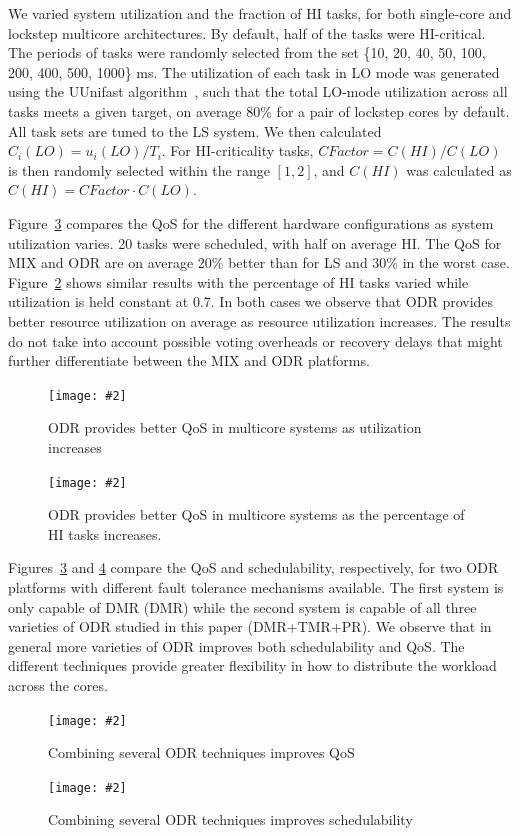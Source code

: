\documentclass[conference]{IEEEtran}
\newcommand{\addfigure}[4]{
\begin{figure}[fh]
	\centering
	\texttt{[image: \#2]}
	\caption{#3}
	\label{#4}
\end{figure}
}
\begin{document}
	We varied system utilization and the fraction of HI tasks, for both single-core and lockstep multicore architectures.
	By default, half of the tasks were HI-critical. The periods of tasks were randomly selected from the set \{10, 20, 40, 50, 100, 200, 400, 500, 1000\} ms.
	The utilization of each task in LO mode was generated using the UUnifast algorithm~\cite{bini2005measuring}, such that the total LO-mode utilization across all tasks meets a given target, on average $80\%$ for a pair of lockstep cores by default. All task sets are tuned to the LS system. 
	We then calculated $C_i(LO) =  u_i(LO)/T_i$. 
	For HI-criticality tasks, $CFactor=C(HI)/C(LO)$ is then randomly selected within the range $[1, 2]$, and $C(HI)$ was calculated as $C(HI)=CFactor \cdot C(LO)$.
	
	Figure~\ref{f:mc-mec-qos-hi} compares the QoS for the different hardware configurations as system utilization varies. 20 tasks were scheduled, with half on average HI. The QoS for MIX and ODR are on average 20\% better than for LS and 30\% in the worst case. Figure~\ref{f:mc-hitasks} shows similar results with the percentage of HI tasks varied while utilization is held constant at 0.7. In both cases we observe that ODR provides better resource utilization on average as resource utilization increases. The results do not take into account possible voting overheads or recovery delays that might further differentiate between the MIX and ODR platforms. 
	
	\addfigure{0}{platform-qos.pdf}{ODR provides better QoS in multicore systems as utilization increases}{f:mc-mec-qos-hi}
	\addfigure{0}{hitask.pdf}{ODR provides better QoS in multicore systems as the percentage of HI tasks increases.}{f:mc-hitasks}
	
	Figures~\ref{f:mc-mec-qos-hi} and \ref{f:mc-mec-sched} compare the QoS and schedulability, respectively, for two ODR platforms with different fault tolerance mechanisms available. The first system is only capable of DMR (DMR) while the second system is capable of all three varieties of ODR studied in this paper (DMR+TMR+PR). We observe that in general more varieties of ODR improves both schedulability and QoS. The different techniques provide greater flexibility in how to distribute the workload across the cores. 
	
	\addfigure{0}{mec-qos.pdf}{Combining several ODR techniques improves QoS}{f:mc-mec-qos-hi}
	\addfigure{0}{mec-sched.pdf}{Combining several ODR techniques improves schedulability}{f:mc-mec-sched}
	
\end{document}
